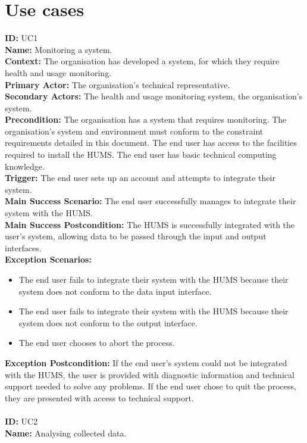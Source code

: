 \documentclass[10pt,a4paper]{article}
\begin{document}
\section{Use cases}
\noindent \textbf{ID:} UC1\\
\textbf{Name:} Monitoring a system.\\
\textbf{Context:} The organisation has developed a system, for which they require health and usage monitoring.\\
\textbf{Primary Actor:} The organisation's technical representative.\\
\textbf{Secondary Actors:} The health and usage monitoring system, the organisation's system.\\
\textbf{Precondition:}  The organisation has a system that requires monitoring. The organisation's system and environment must conform to the constraint requirements detailed in this document. The end user has access to the facilities required to install the HUMS. The end user has basic technical computing knowledge.\\
\textbf{Trigger:} The end user sets up an account and attempts to integrate their system.\\
\textbf{Main Success Scenario:} The end user successfully manages to integrate their system with the HUMS.\\
\textbf{Main Success Postcondition:} The HUMS is successfully integrated with the user's system, allowing data to be passed through the input and output interfaces.\\
\textbf{Exception Scenarios:}
\begin{itemize}
\item The end user fails to integrate their system with the HUMS because their system does not conform to the data input interface.
\item The end user fails to integrate their system with the HUMS because their system does not conform to the output interface.
\item The end user chooses to abort the process.
\end{itemize}
\textbf{Exception Postcondition:} If the end user's system could not be integrated with the HUMS, the user is provided with diagnostic information and technical support needed to solve any problems. If the end user chose to quit the process, they are presented with access to technical support.\\\\
\noindent \textbf{ID:} UC2\\
\textbf{Name:} Analysing collected data.\\
\end{document}
